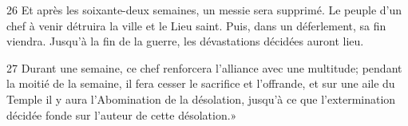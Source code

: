 
26 Et après les soixante-deux semaines, un messie sera supprimé. Le peuple d’un chef à venir détruira la ville et le Lieu saint. Puis, dans un déferlement, sa fin viendra. Jusqu’à la fin de la guerre, les dévastations décidées auront lieu.

27 Durant une semaine, ce chef renforcera l’alliance avec une multitude; pendant la moitié de la semaine, il fera cesser le sacrifice et l’offrande, et sur une aile du Temple il y aura l’Abomination de la désolation, jusqu’à ce que l’extermination décidée fonde sur l’auteur de cette désolation.»

